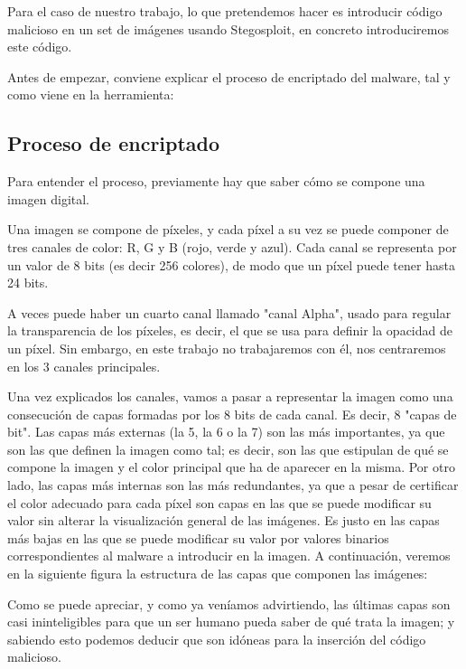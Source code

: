 Para el caso de nuestro trabajo, lo que pretendemos hacer es introducir código malicioso en un set de imágenes usando Stegosploit, en concreto introduciremos este código.


Antes de empezar, conviene explicar el proceso de encriptado del malware, tal y como viene en la herramienta:

\subsection{Proceso de encriptado}

Para entender el proceso, previamente hay que saber cómo se compone una imagen digital.

Una imagen se compone de píxeles, y cada píxel a su vez se puede componer de tres canales de color: R, G y B (rojo, verde y azul). Cada canal se representa por un valor de 8 bits (es decir 256 colores), de modo que un píxel puede tener hasta 24 bits. %

A veces puede haber un cuarto canal llamado "canal Alpha", usado para regular la transparencia de los píxeles, es decir, el que se usa para definir la opacidad de un píxel. Sin embargo, en este trabajo no trabajaremos con él, nos centraremos en los 3 canales principales. %

Una vez explicados los canales, vamos a pasar a representar la imagen como una consecución de capas formadas por los 8 bits de cada canal. Es decir, 8 "capas de bit". Las capas más externas (la 5, la 6 o la 7) son las más importantes, ya que son las que definen la imagen como tal; es decir, son las que estipulan de qué se compone la imagen y el color principal que ha de aparecer en la misma. Por otro lado, las capas más internas son las más redundantes, ya que a pesar de certificar el color adecuado para cada píxel son capas en las que se puede modificar su valor sin alterar la visualización general de las imágenes. Es justo en las capas más bajas en las que se puede modificar su valor por valores binarios correspondientes al malware a introducir en la imagen. A continuación, veremos en la siguiente figura la estructura de las capas que componen las imágenes:


Como se puede apreciar, y como ya veníamos advirtiendo, las últimas capas son casi ininteligibles para que un ser humano pueda saber de qué trata la imagen; y sabiendo esto podemos deducir que son idóneas para la inserción del código malicioso.


